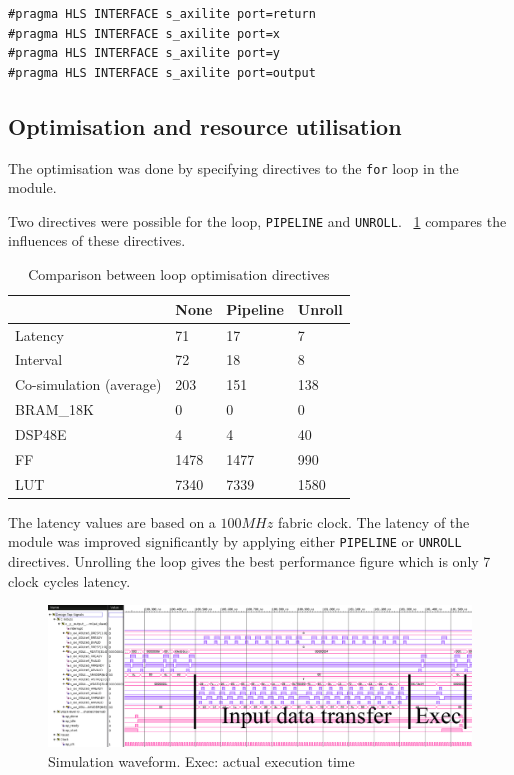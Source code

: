 \documentclass[journal]{IEEEtran}
\newcommand{\tref}[1]{\tablename~\ref{#1}}
\begin{document}
\begin{lstlisting}[caption={AXI4-lite directives added to the dot product module},captionpos=b,label=lst:dotp_lite]
#pragma HLS INTERFACE s_axilite port=return
#pragma HLS INTERFACE s_axilite port=x
#pragma HLS INTERFACE s_axilite port=y
#pragma HLS INTERFACE s_axilite port=output
\end{lstlisting}

\subsection{Optimisation and resource utilisation}

The optimisation was done by specifying directives to the \texttt{for} loop in the module.

Two directives were possible for the loop, \texttt{PIPELINE} and \texttt{UNROLL}. \tref{tbl:dir} compares the influences of these directives.

\begin{table}[!ht]
	\renewcommand{\arraystretch}{1.3}
	\caption{Comparison between loop optimisation directives}
	\label{tbl:dir}
	\centering
	\begin{tabular}{llll}
		\hline
			& None	& Pipeline	& Unroll \\
		\hline
		Latency	& 71	& 17	& 7	\\
		Interval	& 72	& 18	& 8	\\
		Co-simulation (average)	& 203	& 151	& 138	\\
		\hline
		BRAM\_18K	& 0	& 0	& 0	\\
		DSP48E	& 4	& 4	& 40	\\
		FF	& 1478	& 1477	& 990	\\
		LUT	& 7340	& 7339	& 1580	\\
		\hline
	\end{tabular}
\end{table}

The latency values are based on a $100 MHz$ fabric clock. The latency of the module was improved significantly by applying either \texttt{PIPELINE} or \texttt{UNROLL} directives. Unrolling the loop gives the best performance figure which is only 7 clock cycles latency.

\begin{figure}[!t]
	\centering
	\includegraphics[width=\textwidth]{sim}
	\caption{Simulation waveform. Exec: actual execution time}
	\label{fig:sim}
\end{figure}
\end{document}
